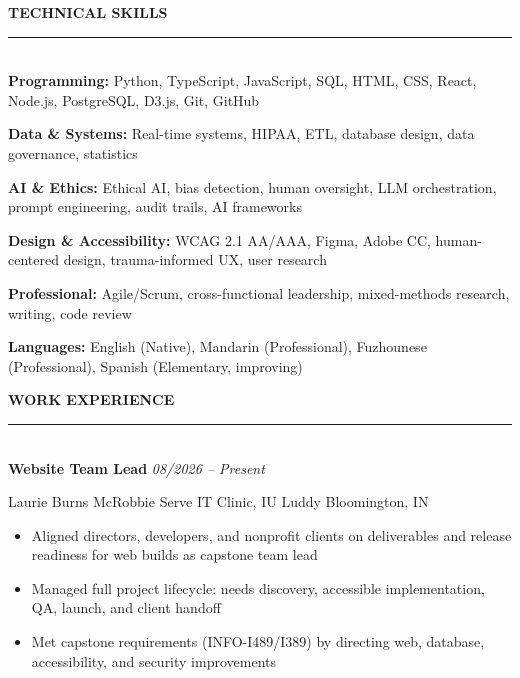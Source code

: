 \documentclass[10pt]{article}
\newcommand{\ressection}[1]{%
  \vspace{4pt plus 1pt}%
  {\bfseries\fontsize{10}{12}\selectfont\MakeUppercase{#1}}\\[-1pt]%
  \rule{\linewidth}{1pt}\\[2pt]%
}
\newcommand{\exphead}[3]{%
  \noindent\textbf{#1} \hfill \textit{#3}\par
  \noindent #2\par
  \vspace{1pt}%
}
\newcommand{\skillline}[2]{\textbf{#1:} #2\par\vspace{1pt}}
\begin{document}
%
\ressection{Technical Skills}
\skillline{Programming}{Python, TypeScript, JavaScript, SQL, HTML, CSS, React, Node.js, PostgreSQL, D3.js, Git, GitHub}
\skillline{Data \& Systems}{Real-time systems, HIPAA, ETL, database design, data governance, statistics}
\skillline{AI \& Ethics}{Ethical AI, bias detection, human oversight, LLM orchestration, prompt engineering, audit trails, AI frameworks}
\skillline{Design \& Accessibility}{WCAG 2.1 AA/AAA, Figma, Adobe CC, human-centered design, trauma-informed UX, user research}
\skillline{Professional}{Agile/Scrum, cross-functional leadership, mixed-methods research, writing, code review}
\skillline{Languages}{English (Native), Mandarin (Professional), Fuzhounese (Professional), Spanish (Elementary, improving)}
\vspace{-2pt}

%
\ressection{Work Experience}

\exphead{Website Team Lead}{Laurie Burns McRobbie Serve IT Clinic, IU Luddy \hfill Bloomington, IN}{08/2026 -- Present}
\begin{itemize}
  \item Aligned directors, developers, and nonprofit clients on deliverables and release readiness for web builds as capstone team lead
  \item Managed full project lifecycle: needs discovery, accessible implementation, QA, launch, and client handoff
  \item Met capstone requirements (INFO-I489/I389) by directing web, database, accessibility, and security improvements
\end{itemize}
\end{document}
